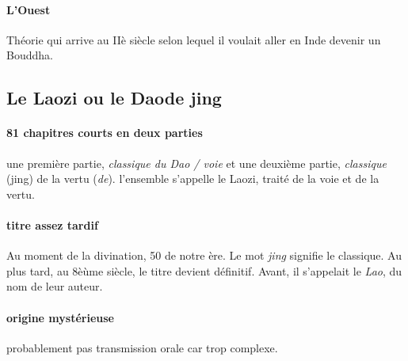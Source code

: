 \paragraph{L'Ouest} Théorie qui arrive au IIè siècle selon lequel il voulait aller en Inde devenir un Bouddha.



 \subsection{Le Laozi ou le Daode jing }

\paragraph{81 chapitres courts en deux parties} 
une première partie, \textit{classique du Dao / voie} et une deuxième partie, \textit{classique} (jing) de la vertu (\textit{de}). l'ensemble s'appelle le Laozi, traité de la voie et de la vertu.

\paragraph{titre assez tardif} Au moment de la divination, 50 de notre ère. Le mot \textit{jing} signifie le classique. Au plus tard, au 8èùme siècle, le titre devient définitif. Avant, il s'appelait le \textit{Lao}, du nom de leur auteur. 

\paragraph{origine mystérieuse} probablement pas transmission orale car trop complexe. 

